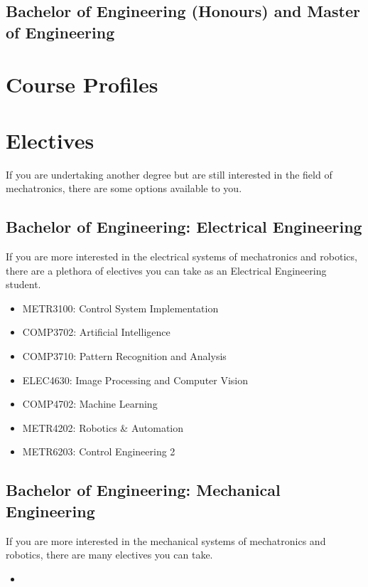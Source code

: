 \documentclass[a4paper,12pt]{report}
\begin{document}
\newpage

\section{Bachelor of Engineering (Honours) and Master of Engineering}


\chapter{Course Profiles}




\chapter{Electives}
If you are undertaking another degree but are still interested in the field of mechatronics, there are some options available to you.

\section{Bachelor of Engineering: Electrical Engineering}
\vspace*{3mm}
If you are more interested in the electrical systems of mechatronics and robotics, there are a plethora of electives you can take as an Electrical Engineering student.
\begin{multicols}{2}
    \begin{itemize}
        \item METR3100: Control System Implementation
        \item COMP3702: Artificial Intelligence
        \item COMP3710: Pattern Recognition and Analysis
        \item ELEC4630: Image Processing and Computer Vision
        \item COMP4702: Machine Learning
        \item METR4202: Robotics \& Automation
        \item METR6203: Control Engineering 2
    \end{itemize}
\end{multicols}

\section{Bachelor of Engineering: Mechanical Engineering}
\vspace*{3mm}
If you are more interested in the mechanical systems of mechatronics and robotics, there are many electives you can take.
\begin{multicols}{2}
    \begin{itemize}
        \item 
    \end{itemize}
\end{multicols}
\end{document}
